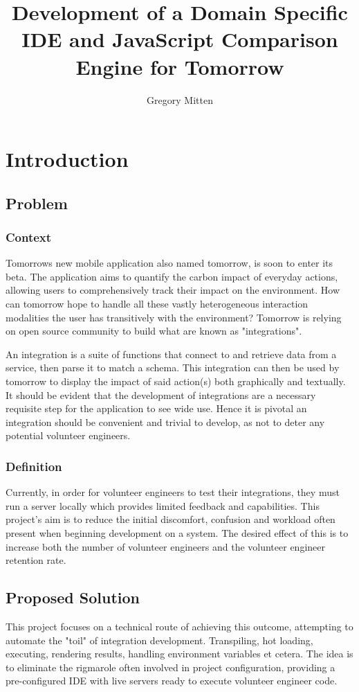 \documentclass[jou,apacite]{apa6}
\title{Development of a Domain Specific IDE and JavaScript Comparison Engine for Tomorrow}
\author{Gregory Mitten}
\affiliation{University of Sussex}
\begin{document}
\maketitle    
                        
\section{Introduction}
\subsection{Problem}
\subsubsection{Context}
Tomorrow\textquotesingle s new mobile application also named tomorrow, is soon to enter its beta. The application aims to quantify the carbon impact of everyday actions, allowing users to comprehensively track their impact on the environment. How can tomorrow hope to handle all these vastly heterogeneous interaction modalities the user has transitively with the environment? Tomorrow is relying on open source community to build what are known as "integrations".

An integration is a suite of functions that connect to and retrieve data from a service, then parse it to match a schema. This integration can then be used by tomorrow to display the impact of said action(s) both graphically and textually. It should be evident that the development of integrations are a necessary requisite step for the application to see wide use. Hence it is pivotal an integration should be convenient and trivial to develop, as not to deter any potential volunteer engineers.
\subsubsection{Definition}
Currently, in order for volunteer engineers to test their integrations, they must run a server locally which provides limited feedback and capabilities. This project’s aim is to reduce the initial discomfort, confusion and workload often present when beginning development on a system. The desired effect of this is to increase both the number of volunteer engineers and the volunteer engineer retention rate.

\subsection{Proposed Solution}
This project focuses on a technical route of achieving this outcome, attempting to automate the "toil" \cite{beyerjonespetoffmurphy} of integration development.  Transpiling, hot loading, executing, rendering results, handling environment variables et cetera. The idea is to eliminate the rigmarole often involved in project configuration, providing a pre-configured IDE with live servers ready to execute volunteer engineer code. 
\end{document}
